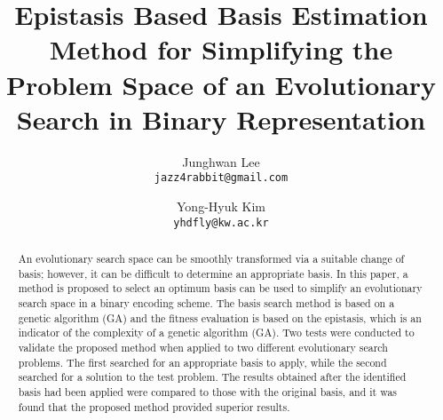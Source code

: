 \documentclass[a4paper]{article}
\title{Epistasis Based Basis Estimation Method for Simplifying the Problem Space of an Evolutionary Search in Binary Representation}
\author{
	Junghwan Lee\\
	\texttt{jazz4rabbit@gmail.com}
	\and
	Yong-Hyuk Kim\\
	\texttt{yhdfly@kw.ac.kr}
}
\date{}
\begin{document}
\maketitle
	
\begin{abstract}
	An evolutionary search space can be smoothly transformed via a suitable change of basis; however, it can be difficult to determine an appropriate basis. In this paper, a method is proposed to select an optimum basis can be used to simplify an evolutionary search space in a binary encoding scheme. The basis search method is based on a genetic algorithm (GA) and the fitness evaluation is based on the epistasis, which is an indicator of the complexity of a genetic algorithm (GA). Two tests were conducted to validate the proposed method when applied to two different evolutionary search problems. The first searched for an appropriate basis to apply, while the second searched for a solution to the test problem. The results obtained after the identified basis had been applied were compared to those with the original basis, and it was found that the proposed method provided superior results.
\end{abstract}




{}

%
\end{document}
